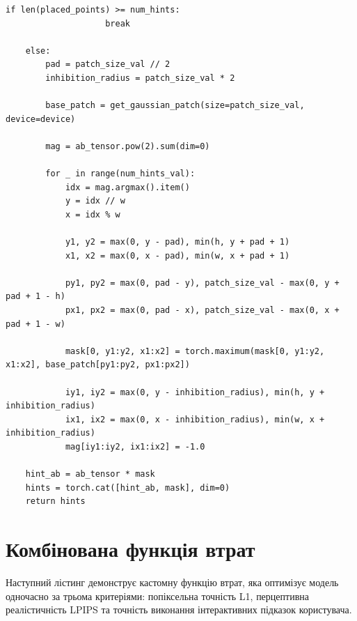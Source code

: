 \begin{lstlisting}[caption={Функція генерації Гауссівських підказок}]
                if len(placed_points) >= num_hints:
                    break

    else:
        pad = patch_size_val // 2
        inhibition_radius = patch_size_val * 2 

        base_patch = get_gaussian_patch(size=patch_size_val, device=device)

        mag = ab_tensor.pow(2).sum(dim=0) 

        for _ in range(num_hints_val):
            idx = mag.argmax().item()
            y = idx // w
            x = idx % w

            y1, y2 = max(0, y - pad), min(h, y + pad + 1)
            x1, x2 = max(0, x - pad), min(w, x + pad + 1)
            
            py1, py2 = max(0, pad - y), patch_size_val - max(0, y + pad + 1 - h)
            px1, px2 = max(0, pad - x), patch_size_val - max(0, x + pad + 1 - w)

            mask[0, y1:y2, x1:x2] = torch.maximum(mask[0, y1:y2, x1:x2], base_patch[py1:py2, px1:px2])

            iy1, iy2 = max(0, y - inhibition_radius), min(h, y + inhibition_radius)
            ix1, ix2 = max(0, x - inhibition_radius), min(w, x + inhibition_radius)
            mag[iy1:iy2, ix1:ix2] = -1.0

    hint_ab = ab_tensor * mask
    hints = torch.cat([hint_ab, mask], dim=0)
    return hints
\end{lstlisting}

\section{Комбінована функція втрат}

Наступний лістинг демонструє кастомну функцію втрат, яка оптимізує модель одночасно за трьома критеріями: попіксельна точність L1, перцептивна реалістичність LPIPS та точність виконання інтерактивних підказок користувача.

